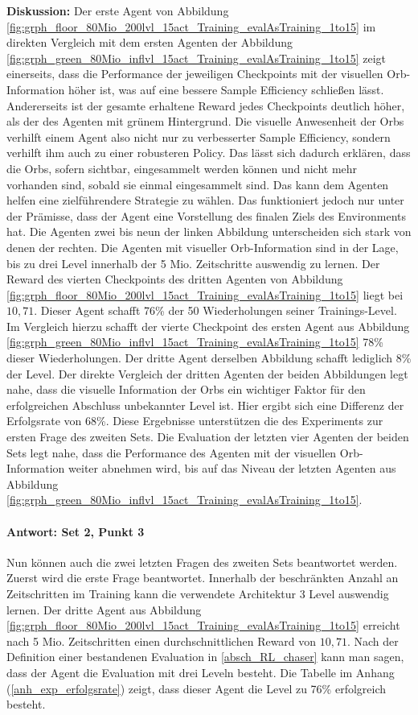 \textbf{Diskussion:} Der erste Agent von Abbildung \ref{fig:grph_floor_80Mio_200lvl_15act_Training_evalAsTraining_1to15} im direkten Vergleich mit dem ersten Agenten der Abbildung \ref{fig:grph_green_80Mio_inflvl_15act_Training_evalAsTraining_1to15} zeigt einerseits, dass die Performance der jeweiligen Checkpoints mit der visuellen Orb-Information höher ist, was auf eine bessere Sample Efficiency schließen lässt. Andererseits ist der gesamte erhaltene Reward jedes Checkpoints deutlich höher, als der des Agenten mit grünem Hintergrund. Die visuelle Anwesenheit der Orbs verhilft einem Agent also nicht nur zu verbesserter Sample Efficiency, sondern verhilft ihm auch zu einer robusteren Policy. Das lässt sich dadurch erklären, dass die Orbs, sofern sichtbar, eingesammelt werden können und nicht mehr vorhanden sind, sobald sie einmal eingesammelt sind. Das kann dem Agenten helfen eine zielführendere Strategie zu wählen. Das funktioniert jedoch nur unter der Prämisse, dass der Agent eine Vorstellung des finalen Ziels des Environments hat. Die Agenten zwei bis neun der linken Abbildung unterscheiden sich stark von denen der rechten. Die Agenten mit visueller Orb-Information sind in der Lage, bis zu drei Level innerhalb der 5 Mio. Zeitschritte auswendig zu lernen. Der Reward des vierten Checkpoints des dritten Agenten von Abbildung \ref{fig:grph_floor_80Mio_200lvl_15act_Training_evalAsTraining_1to15} liegt bei $10,71$. Dieser Agent schafft 76\% der 50 Wiederholungen seiner Trainings-Level. Im Vergleich hierzu schafft der vierte Checkpoint des ersten Agent aus Abbildung \ref{fig:grph_green_80Mio_inflvl_15act_Training_evalAsTraining_1to15} 78\% dieser Wiederholungen. Der dritte Agent derselben Abbildung schafft lediglich 8\% der Level. Der direkte Vergleich der dritten Agenten der beiden Abbildungen legt nahe, dass die visuelle Information der Orbs ein wichtiger Faktor für den erfolgreichen Abschluss unbekannter Level ist. Hier ergibt sich eine Differenz der Erfolgsrate von 68\%. Diese Ergebnisse unterstützen die des Experiments zur ersten Frage des zweiten Sets. Die Evaluation der letzten vier Agenten der beiden Sets legt nahe, dass die Performance des Agenten mit der visuellen Orb-Information weiter abnehmen wird, bis auf das Niveau der letzten Agenten aus Abbildung \ref{fig:grph_green_80Mio_inflvl_15act_Training_evalAsTraining_1to15}.\\

\paragraph{Antwort: Set 2, Punkt 3}
Nun können auch die zwei letzten Fragen des zweiten Sets beantwortet werden. Zuerst wird die erste Frage beantwortet. Innerhalb der beschränkten Anzahl an Zeitschritten im Training kann die verwendete Architektur 3 Level auswendig lernen. Der dritte Agent aus Abbildung \ref{fig:grph_floor_80Mio_200lvl_15act_Training_evalAsTraining_1to15} erreicht nach 5 Mio. Zeitschritten einen durchschnittlichen Reward von $10,71$. Nach der Definition einer bestandenen Evaluation in \ref{absch_RL_chaser} kann man sagen, dass der Agent die Evaluation mit drei Leveln besteht. Die Tabelle im Anhang (\ref{anh_exp_erfolgsrate}) zeigt, dass dieser Agent die Level zu 76\% erfolgreich besteht. 

